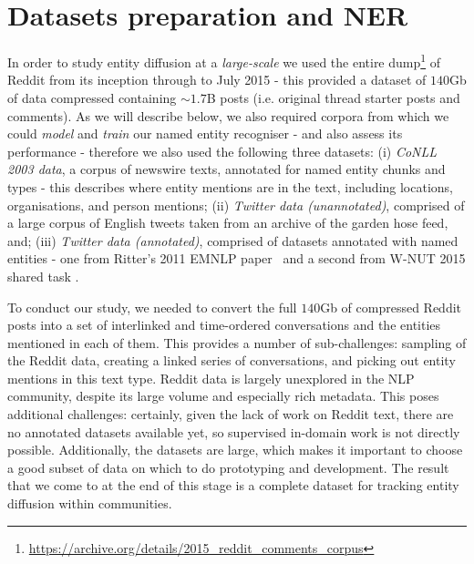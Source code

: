 \documentclass[10pt,journal,compsoc]{IEEEtran}
\begin{document}
%


\section{Datasets preparation and NER}
\label{sec:datasets_ner} 
In order to study entity diffusion at a \emph{large-scale} we used the entire dump\footnote{\url{https://archive.org/details/2015_reddit_comments_corpus}} of Reddit from its inception through to July 2015 - this provided a dataset of $140$Gb of data compressed containing $\sim1.7$B posts (i.e. original thread starter posts and comments).
As we will describe below, we also required corpora from which we could \emph{model} and \emph{train} our named entity recogniser - and also assess its performance - therefore we also used the following three datasets:
(i) \emph{CoNLL 2003 data}, a corpus of newswire texts, annotated for named entity chunks and types - this describes where entity mentions are in the text, including locations, organisations, and person mentions; 
(ii) \emph{Twitter data (unannotated)}, comprised of a large corpus of English tweets taken from an archive of the garden hose feed, and; 
(iii) \emph{Twitter data (annotated)}, comprised of datasets annotated with named entities - one from Ritter's 2011 EMNLP paper~\cite{ritter2011named} and a second from W-NUT 2015 shared task \cite{baldwin2015shared}.

To conduct our study, we needed to convert the full $140$Gb of compressed Reddit posts into a set of interlinked and time-ordered conversations and the entities mentioned in each of them.
This provides a number of sub-challenges: sampling of the Reddit data, creating a linked series of conversations, and picking out entity mentions in this text type.
Reddit data is largely unexplored in the NLP community, despite its large volume and especially rich metadata.
This poses additional challenges: certainly, given the lack of work on Reddit text, there are no annotated datasets available yet, so supervised in-domain work is not directly possible.
Additionally, the datasets are large, which makes it important to choose a good subset of data on which to do prototyping and development.
The result that we come to at the end of this stage is a complete dataset for tracking entity diffusion within communities.
\end{document}

